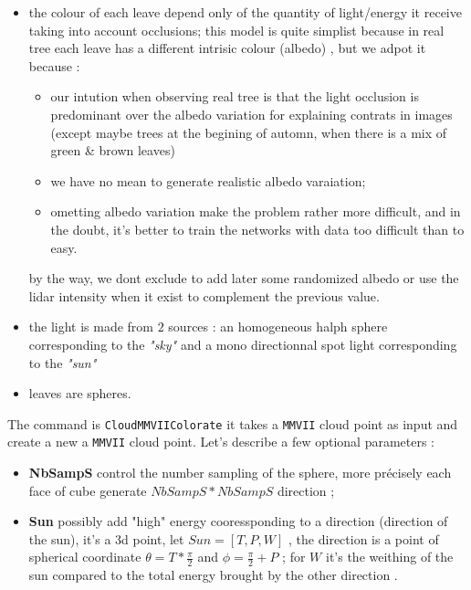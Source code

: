 \begin{itemize}
   \item the colour of each leave depend only of the quantity of light/energy it receive taking into account occlusions;
         this model is quite simplist because in real tree each leave has a different intrisic
         colour (albedo) , but we adpot it because :
         \begin{itemize}
              \item  our intution when observing real tree is that the light occlusion is predominant over the albedo
                     variation for explaining contrats in images (except maybe trees at the begining of automn, 
                     when there is a mix of green \& brown leaves)
              \item  we have no mean to generate realistic albedo varaiation;
              \item  ometting albedo variation make the problem rather more difficult, and in the doubt, it's better
                     to train the networks with data too difficult than to easy.
         \end{itemize}

         by the way, we dont exclude to add later some randomized albedo or use the lidar  intensity when it exist
         to complement the previous value.


   \item the light is made from $2$ sources : an homogeneous halph sphere corresponding to the \emph{"sky"} and a mono directionnal spot light 
         corresponding to the \emph{"sun"}

   \item leaves are spheres.

\end{itemize}


The command is {\tt CloudMMVIIColorate} it takes a {\tt MMVII} cloud point as input and create a new a {\tt MMVII} cloud point.
Let's describe a few optional parameters :

\begin{itemize}
   \item  {\bf NbSampS} control the  number sampling of the sphere,  more précisely each face
         of cube generate $NbSampS*NbSampS$ direction ;

   \item {\bf Sun}  possibly add "high" energy cooressponding  to  a direction (direction of the sun), it's a 3d point,
         let $Sun=[T,P,W]$  , the direction is a point of spherical coordinate $\theta = T * \frac{\pi}{2}$ and
        $\phi = \frac{\pi}{2} + P$  ;  for $W$ it's the weithing of the sun compared to the total energy brought by the 
        other direction .
\end{itemize}

